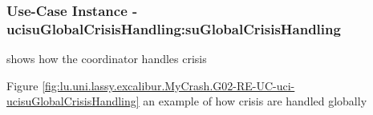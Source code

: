 
	\subsubsection{Use-Case Instance - ucisuGlobalCrisisHandling:suGlobalCrisisHandling}
	
	shows how the coordinator handles crisis		  
	\begin{operationmodel}
	
	\end{operationmodel} 

	
	Figure \ref{fig:lu.uni.lassy.excalibur.MyCrash.G02-RE-UC-uci-ucisuGlobalCrisisHandling}
	an example of how crisis are handled globally
	
